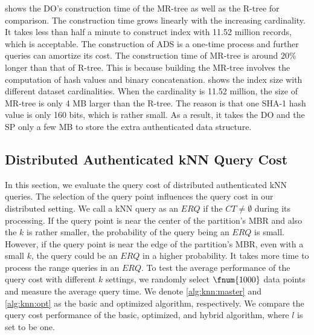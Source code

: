  shows the DO's construction time of the MR-tree as well as the R-tree for comparison. The construction time grows linearly with the increasing cardinality. It takes less than half a minute to construct index with 11.52 million records, which is acceptable. The construction of ADS is a one-time process and further queries can amortize its cost. The construction time of MR-tree is around $20\%$ longer than that of R-tree. This is because building the MR-tree involves the computation of hash values and binary concatenation.  shows the index size with different dataset cardinalities. When the cardinality is 11.52 million, the size of MR-tree is only 4 MB larger than the R-tree. The reason is that one SHA-1 hash value is only 160 bits, which is rather small. As a result, it takes the DO and the SP only a few MB to store the extra authenticated data structure.

\subsection{Distributed Authenticated kNN Query Cost}

In this section, we evaluate the query cost of distributed authenticated kNN queries. The selection of the query point influences the query cost in our distributed setting. We call a kNN query as an $ERQ$ if the $CT\neq\emptyset$ during its processing. If the query point is near the center of the partition's MBR and also the $k$ is rather smaller, the probability of the query being an $ERQ$ is small. However, if the query point is near the edge of the partition's MBR, even with a small $k$, the query could be an $ERQ$ in a higher probability. It takes more time to process the range queries in an $ERQ$. To test the average performance of the query cost with different $k$ settings, we randomly select $\fnum{1000}$ data points and measure the average query time. We denote \cref{alg:knn:master} and \cref{alg:knn:opt} as the basic and optimized algorithm, respectively. We compare the query cost performance of the basic, optimized, and hybrid algorithm, where $l$ is set to be one.

